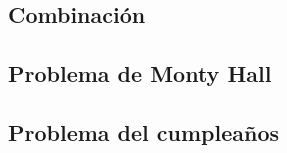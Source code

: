 \subsection{Combinación}

\subsection{Problema de Monty Hall}

\subsection{Problema del cumpleaños}


